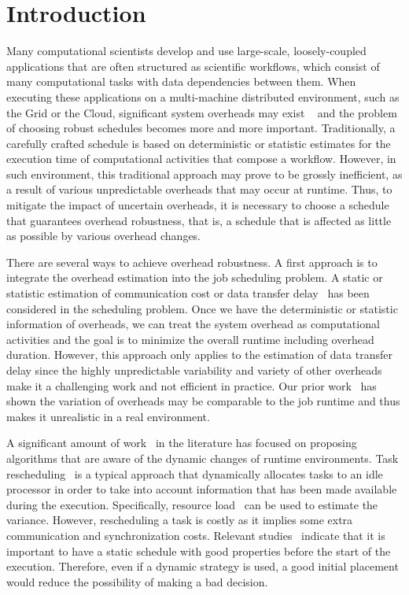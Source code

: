 \documentclass[final]{IEEEtran}
\begin{document}
\section{Introduction}

Many computational scientists develop and use large-scale, loosely-coupled applications that are often structured as scientific workflows, which consist of many computational tasks with data dependencies between them. When executing these applications on a multi-machine distributed environment, such as the Grid or the Cloud, significant system overheads may exist ~\cite{Chen} and the problem of choosing robust schedules becomes more and more important. Traditionally, a carefully crafted schedule is based on deterministic or statistic estimates for the execution time of computational activities that compose a workflow. However, in such environment, this traditional approach may prove to be grossly inefficient, as a result of various unpredictable overheads that may occur at runtime. 
Thus, to mitigate the impact of uncertain overheads, it is necessary to choose a schedule that guarantees overhead robustness, that is, a schedule that is affected as little as possible by various overhead changes.  

There are several ways to achieve overhead robustness. A first approach is to integrate the overhead estimation into the job scheduling problem. A static or statistic estimation of communication cost or data transfer delay~\cite{Dong2010, Yang03} has been considered in the scheduling problem. Once we have the deterministic or statistic information of overheads, we can treat the system overhead as computational activities and the goal is to minimize the overall runtime including overhead duration. However, this approach only applies to the estimation of data transfer delay since the highly unpredictable variability and variety of other overheads make it a challenging work and not efficient in practice. Our prior work~\cite{Chen} has shown the variation of overheads may be comparable to the job runtime and thus makes it unrealistic in a real environment.  

A significant amount of work~\cite{Ahmad1998, Chetto1990, Dong2010, Yang03} in the literature has focused on proposing algorithms that are aware of the dynamic changes of runtime environments. Task rescheduling~\cite{Sakellariou2004, Zhang2009} is a typical approach that dynamically allocates tasks to an idle processor in order to take into account information that has been made available during the execution. Specifically, resource load~\cite{Dong2010} can be used to estimate the variance. However, rescheduling a task is costly as it implies some extra communication and synchronization costs. Relevant studies~\cite{Sakellariou2004} indicate that it is important to have a static schedule with good properties before the start of the execution. Therefore, even if a dynamic strategy is used, a good initial placement would reduce the possibility of making a bad decision. 
\end{document}
